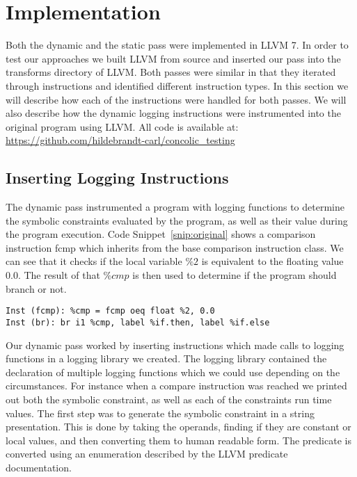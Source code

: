 
\section{Implementation}

Both the dynamic and the static pass were implemented in LLVM 7. In order to test our approaches we built LLVM from source and inserted our pass into the transforms directory of LLVM. Both passes were similar in that they iterated through instructions and identified different instruction types. In this section we will describe how each of the instructions were handled for both passes. We will also describe how the dynamic logging instructions were instrumented into the original program using LLVM. All code is available at: \url{https://github.com/hildebrandt-carl/concolic_testing}

\subsection{Inserting Logging Instructions}

The dynamic pass instrumented a program with logging functions to determine the symbolic constraints evaluated by the program, as well as their value during the program execution. Code Snippet~\ref{snip:original} shows a comparison instruction fcmp which inherits from the base comparison instruction class. We can see that it checks if the local variable $\%2$ is equivalent to the floating value $0.0$. The result of that $\%cmp$ is then used to determine if the program should branch or not.

\vspace{-0.6cm}

\begin{lstlisting}[caption={Original Branching Code}, label=snip:original]
Inst (fcmp): %cmp = fcmp oeq float %2, 0.0
Inst (br): br i1 %cmp, label %if.then, label %if.else
\end{lstlisting}


Our dynamic pass worked by inserting instructions which made calls to logging functions in a logging library we created. The logging library contained the declaration of multiple logging functions which we could use depending on the circumstances. For instance when a compare instruction was reached we printed out both the symbolic constraint, as well as each of the constraints run time values. The first step was to generate the symbolic constraint in a string presentation. This is done by taking the operands, finding if they are constant or local values, and then converting them to human readable form. The predicate is converted using an enumeration described by the LLVM predicate documentation.


